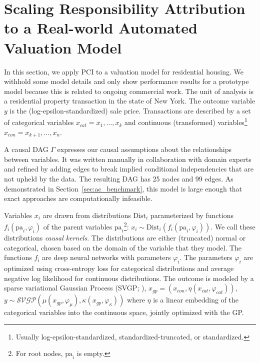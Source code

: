 \documentclass[anon,12pt]{clear2026} %
\newcommand{\ourapproach}{PCI }
\begin{document}



\section{Scaling Responsibility Attribution to a Real-world Automated Valuation Model}\label{sec:avm}

In this section, we apply \ourapproach to a valuation model for residential housing.
We withhold some model details and only show performance results for a prototype model because this is related to ongoing commercial work.
The unit of analysis is a residential property transaction in the state of New York.
The outcome variable $y$ is the (log-epsilon-standardized) sale price. Transactions are described by a set of categorical variables $x_{cat} = x_{1}, \dots, x_k$ and continuous (transformed) variables\footnote{Usually log-epsilon-standardized, standardized-truncated, or standardized.} $x_{con} = x_{k+1}, \dots, x_n$.

A causal DAG $\Gamma$ expresses our causal assumptions about the relationships between variables.
It was written manually in collaboration with domain experts and refined by adding edges to break implied conditional independencies that are not upheld by the data.
The resulting DAG has 25 nodes and 99 edges.
As demonstrated in Section~\ref{sec:ac_benchmark}, this model is large enough that exact approaches are computationally infeasible.

Variables $x_i$ are drawn from distributions $\mathrm{Dist}_i$ parameterized by functions $f_i(\mathrm{pa}_i, \varphi_i)$ of the parent variables $\mathrm{pa}_i$\footnote{For root nodes, $\mathrm{pa}_i$ is empty.}: $x_i \sim \mathrm{Dist}_i(f_i(\mathrm{pa}_i, \varphi_i))$.
We call these distributions \emph{causal kernels}.
The distributions are either (truncated) normal or categorical, chosen based on the domain of the variable that they model.
The functions $f_i$ are deep neural networks with parameters $\varphi_i$.
The parameters $\varphi_i$ are optimized using cross-entropy loss for categorical distributions and average negative log likelihood for continuous distributions.  The outcome is modeled by a sparse variational Gaussian Process (SVGP; \citealp{titsias2009variational,hensman2013gaussian}),  $x_{gp}  = (x_{con}, \eta(x_{cat}, \varphi_{cat}) )$, $y  \sim \mathcal{SVGP}\left(\mu(x_{gp}, \varphi_\mu), \kappa(x_{gp}, \varphi_\kappa)\right)$ where $\eta$ is a linear embedding of the categorical variables into the continuous space, jointly optimized with the GP.
\end{document}
